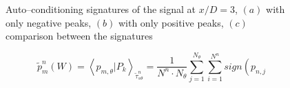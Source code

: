 \documentclass[english]{aiaa-tc}
\begin{document}
\begin{figure}
\begin{centering}
\end{centering}
\caption{Auto--conditioning signatures of the signal at $x/D = 3$, $(a)$ with only negative peaks, $(b)$ with only positive peaks, $(c)$ comparison between the signatures}\label{compPeaks}
\end{figure}

\begin{equation} \label{condAvgSign}
\tilde{p}_{m}^n\left( W \right) = \left< p_{m,\theta} | P_{k} \right>_{\tilde{\tau}^n_{s\theta}} = \frac{1}{N^n\cdot N_{\theta}} \sum^{N_{\theta}}_{j = 1}\sum^{N^n}_{i = 1} sign\left( p_{n,j} %
\end{equation}
\end{document}
